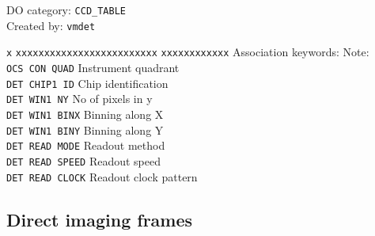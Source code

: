 \begin{itemize}
DO category: {\tt CCD\_TABLE} \\
Created by: {\tt vmdet}

\begin{tabbing}
{\tt x} \= {\tt xxxxxxxxxxxxxxxxxxxxxxxxx} \= {\tt xxxxxxxxxxxx} \kill
\> Association keywords: \> Note: \\
\> {\tt OCS CON QUAD} \> Instrument quadrant \\
\> {\tt DET CHIP1 ID} \> Chip identification \\
\> {\tt DET WIN1 NY} \> No of pixels in y \\
\> {\tt DET WIN1 BINX} \> Binning along X \\
\> {\tt DET WIN1 BINY} \> Binning along Y \\
\> {\tt DET READ MODE} \> Readout method \\
\> {\tt DET READ SPEED} \> Readout speed \\
\> {\tt DET READ CLOCK} \> Readout clock pattern \\
\end{tabbing}

\end{itemize} 

\subsection{Direct imaging frames}
\label{DATA:PRODIMG}

